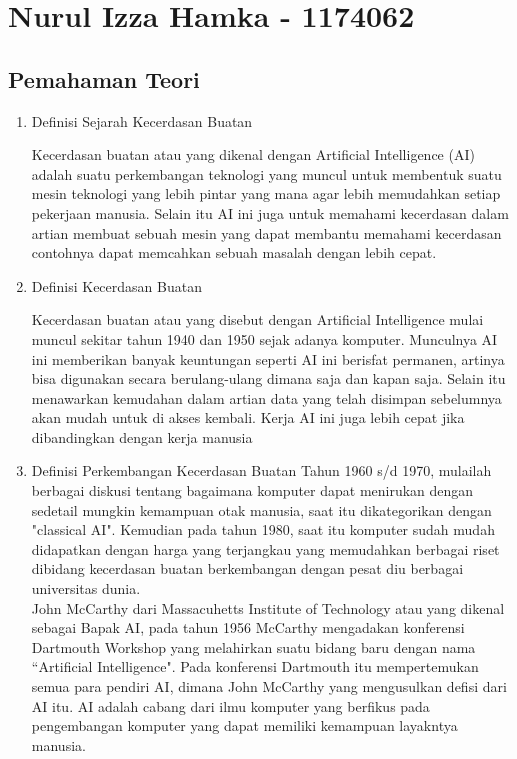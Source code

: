 \section{Nurul Izza Hamka - 1174062}
\subsection{Pemahaman Teori}

\begin{enumerate}

\item Definisi Sejarah Kecerdasan Buatan

Kecerdasan buatan atau yang dikenal dengan Artificial Intelligence (AI) adalah suatu perkembangan teknologi yang muncul untuk membentuk suatu mesin teknologi yang lebih pintar yang mana agar lebih memudahkan setiap pekerjaan manusia. Selain itu AI ini juga untuk memahami kecerdasan dalam artian membuat sebuah mesin yang dapat membantu memahami kecerdasan contohnya dapat memcahkan sebuah masalah dengan lebih cepat.

\item Definisi Kecerdasan Buatan

Kecerdasan buatan atau yang disebut dengan Artificial Intelligence mulai muncul sekitar tahun 1940 dan 1950 sejak adanya komputer. Munculnya AI ini memberikan banyak keuntungan seperti AI ini berisfat permanen, artinya bisa digunakan secara berulang-ulang dimana saja dan kapan saja. Selain itu menawarkan kemudahan dalam artian data yang telah disimpan sebelumnya akan mudah untuk di akses kembali. Kerja AI ini juga lebih cepat jika dibandingkan dengan kerja manusia


\item Definisi Perkembangan Kecerdasan Buatan
Tahun 1960 s/d 1970, mulailah berbagai diskusi tentang bagaimana komputer dapat menirukan dengan sedetail mungkin kemampuan otak manusia, saat itu dikategorikan dengan "classical AI". Kemudian pada tahun 1980, saat itu komputer sudah mudah didapatkan dengan harga yang terjangkau yang memudahkan berbagai riset dibidang kecerdasan buatan berkembangan dengan pesat diu berbagai universitas dunia.\\

John McCarthy dari Massacuhetts Institute of Technology atau yang dikenal sebagai Bapak AI, pada tahun 1956 McCarthy mengadakan konferensi Dartmouth Workshop yang melahirkan suatu bidang baru dengan nama “Artificial Intelligence". Pada konferensi Dartmouth itu mempertemukan semua para pendiri AI, dimana John McCarthy yang mengusulkan defisi dari AI itu. AI adalah cabang dari ilmu komputer yang berfikus pada pengembangan komputer yang dapat memiliki kemampuan layakntya manusia.


\end{enumerate}
